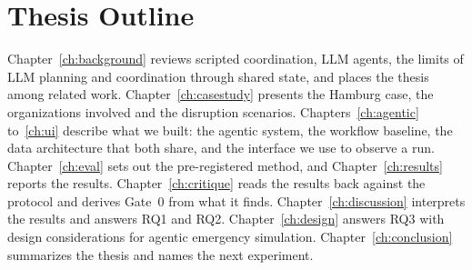\section{Thesis Outline}
\label{sec:intro:outline}

Chapter~\ref{ch:background} reviews scripted coordination, LLM agents, the
limits of LLM planning and coordination through shared state, and places the
thesis among related work. Chapter~\ref{ch:casestudy} presents the Hamburg
case, the organizations involved and the disruption scenarios.
Chapters~\ref{ch:agentic} to~\ref{ch:ui} describe what we built: the agentic
system, the workflow baseline, the data architecture that both share, and the
interface we use to observe a run. Chapter~\ref{ch:eval} sets out the
pre-registered method, and Chapter~\ref{ch:results} reports the results.
Chapter~\ref{ch:critique} reads the results back against the protocol and
derives Gate~0 from what it finds.
Chapter~\ref{ch:discussion} interprets the results and answers RQ1 and RQ2.
Chapter~\ref{ch:design} answers RQ3 with design considerations for agentic
emergency simulation. Chapter~\ref{ch:conclusion} summarizes the thesis and
names the next experiment.
